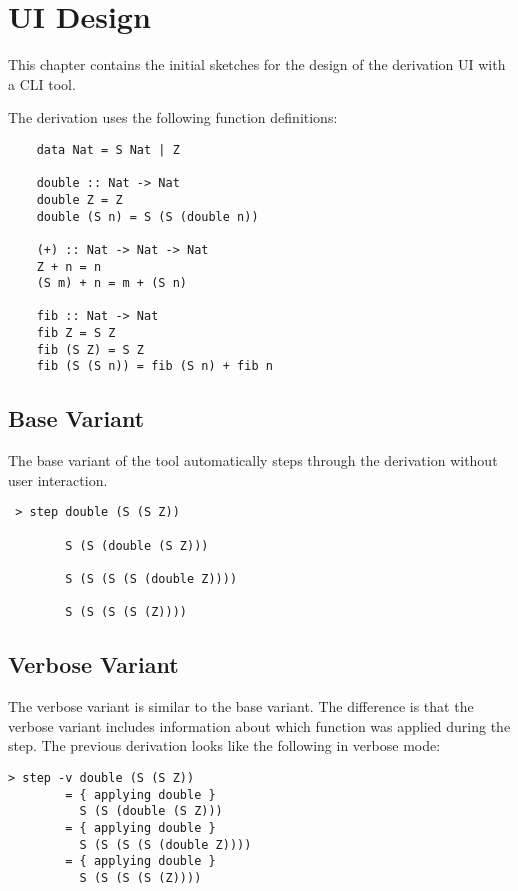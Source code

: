 \chapter{UI Design}

This chapter contains the initial sketches for the design of the derivation UI with a CLI tool.

The derivation uses the following function definitions:

\begin{verbatim}
    data Nat = S Nat | Z

    double :: Nat -> Nat
    double Z = Z
    double (S n) = S (S (double n))

    (+) :: Nat -> Nat -> Nat
    Z + n = n
    (S m) + n = m + (S n)

    fib :: Nat -> Nat
    fib Z = S Z
    fib (S Z) = S Z
    fib (S (S n)) = fib (S n) + fib n
\end{verbatim}

\section{Base Variant}

The base variant of the tool automatically steps through the derivation without user interaction.

\begin{verbatim}
 > step double (S (S Z))

        S (S (double (S Z)))

        S (S (S (S (double Z))))

        S (S (S (S (Z))))
\end{verbatim}

\section{Verbose Variant}

The verbose variant is similar to the base variant.
The difference is that the verbose variant includes information about which function was applied during the step.
The previous derivation looks like the following in verbose mode:

\begin{verbatim}
> step -v double (S (S Z))
        = { applying double }
          S (S (double (S Z)))
        = { applying double }
          S (S (S (S (double Z))))
        = { applying double }
          S (S (S (S (Z))))
\end{verbatim}

